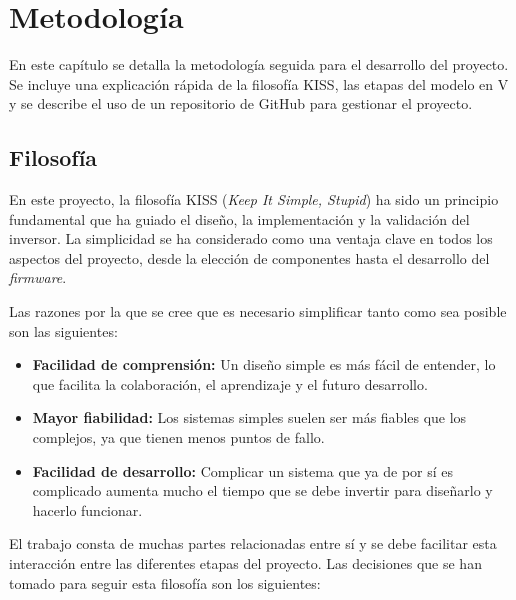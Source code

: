 \chapter{Metodología}

En este capítulo se detalla la metodología seguida para el desarrollo del proyecto. Se incluye una explicación rápida de la filosofía KISS, las etapas del modelo en V y se describe el uso de un repositorio de GitHub para gestionar el proyecto.

\section{Filosofía}
En este proyecto, la filosofía KISS (\textit{Keep It Simple, Stupid}) ha sido un principio fundamental que ha guiado el diseño, la implementación y la validación del inversor. La simplicidad se ha considerado como una ventaja clave en todos los aspectos del proyecto, desde la elección de componentes hasta el desarrollo del \textit{firmware}.

Las razones por la que se cree que es necesario simplificar tanto como sea posible son las siguientes:
\begin{itemize}
	\item \textbf{Facilidad de comprensión:} Un diseño simple es más fácil de entender, lo que facilita la colaboración, el aprendizaje y el futuro desarrollo.
	\item \textbf{Mayor fiabilidad:} Los sistemas simples suelen ser más fiables que los complejos, ya que tienen menos puntos de fallo.
	\item \textbf{Facilidad de desarrollo:} Complicar un sistema que ya de por sí es complicado aumenta mucho el tiempo que se debe invertir para diseñarlo y hacerlo funcionar.
\end{itemize}

El trabajo consta de muchas partes relacionadas entre sí y se debe facilitar esta interacción entre las diferentes etapas del proyecto. Las decisiones que se han tomado para seguir esta filosofía son los siguientes:

